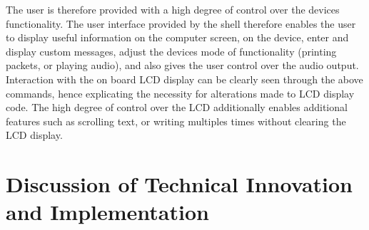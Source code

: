 \par\bigskip\noindent
The user is therefore provided with a high degree of control over the devices 
functionality. The user interface provided by the shell therefore enables the 
user to display useful information on the computer screen, on the device, 
enter and display custom messages, adjust the devices 
mode of functionality (printing packets, or playing audio), and also gives the 
user control over the audio output. 
Interaction with the on board LCD display can be clearly seen through the above 
commands, hence explicating the necessity for alterations made to LCD display 
code.
The high degree of control over the LCD additionally enables additional features 
such as scrolling text, or writing multiples times without clearing the LCD 
display. 

\section{Discussion of Technical Innovation and Implementation}

